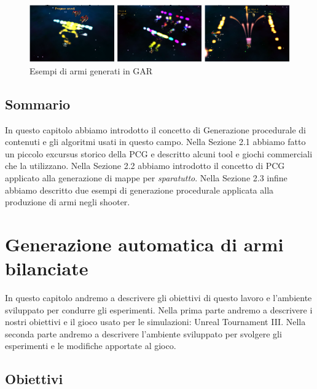 \documentclass[12pt, italian]{toptesi}
\begin{document}
\begin{figure}

\centering
\includegraphics[width=1.0\textwidth]{gar-1}
\caption{Esempi di armi generati in GAR}
\label{fig:gar_2}

\end{figure}

\section{Sommario}
In questo capitolo abbiamo introdotto il concetto di Generazione procedurale di contenuti e gli algoritmi usati in questo campo.
Nella Sezione 2.1 abbiamo fatto un piccolo excursus storico della PCG e descritto alcuni tool e giochi commerciali che la utilizzano.
Nella Sezione 2.2 abbiamo introdotto il concetto di PCG applicato alla generazione di mappe per \emph{sparatutto}.
Nella Sezione 2.3 infine abbiamo descritto due esempi di generazione procedurale applicata alla produzione di armi negli shooter.

\chapter{Generazione automatica di armi bilanciate}

In questo capitolo andremo a descrivere gli obiettivi di questo lavoro e l'ambiente sviluppato per condurre gli esperimenti.
Nella prima parte andremo a descrivere i nostri obiettivi e il gioco usato per le simulazioni: Unreal Tournament III.
Nella seconda parte andremo a descrivere l'ambiente sviluppato per svolgere gli esperimenti e le modifiche apportate al gioco.

\section{Obiettivi}
\end{document}
